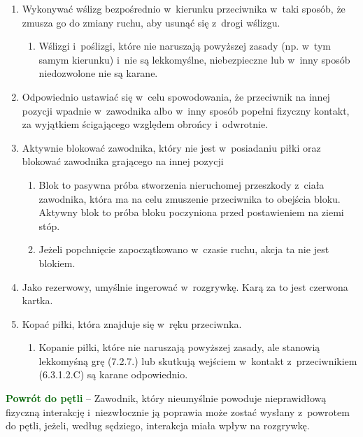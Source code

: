 \documentclass[12pt]{article}
\newcommand\other[1]{\bgroup\textcolor{darkgreen}{\textbf{#1}}}
\begin{document}
\begin{enumerate}
	\item
	      Wykonywać wślizg bezpośrednio w~kierunku przeciwnika w~taki sposób, że
	      zmusza go do zmiany ruchu, aby usunąć się z~drogi wślizgu.

	      \begin{enumerate}
		      \item
		            Wślizgi i~poślizgi, które nie naruszają powyższej zasady (np. w~tym
		            samym kierunku) i~nie są lekkomyślne, niebezpieczne lub w~inny
		            sposób niedozwolone nie są karane.
	      \end{enumerate}
	\item
	      Odpowiednio ustawiać się w~celu spowodowania, że przeciwnik na innej
	      pozycji wpadnie w~zawodnika albo w~inny sposób popełni fizyczny
	      kontakt, za wyjątkiem ścigającego względem obrońcy i~odwrotnie.
	\item
	      Aktywnie blokować zawodnika, który nie jest w~posiadaniu piłki oraz
	      blokować zawodnika grającego na innej pozycji

	      \begin{enumerate}
		      \item
		            Blok to pasywna próba stworzenia nieruchomej przeszkody z~ciała
		            zawodnika, która ma na celu zmuszenie przeciwnika to obejścia bloku.
		            Aktywny blok to próba bloku poczyniona przed postawieniem na ziemi
		            stóp.
		      \item
		            Jeżeli popchnięcie zapoczątkowano w~czasie ruchu, akcja ta nie jest
		            blokiem.
	      \end{enumerate}
	\item
	      Jako rezerwowy, umyślnie ingerować w~rozgrywkę. Karą za to jest
	      czerwona kartka.
	\item
	      Kopać piłki, która znajduje się w~ręku przeciwnka.

	      \begin{enumerate}
		      \item
		            Kopanie piłki, które nie naruszają powyższej zasady, ale stanowią
		            lekkomyśną grę (7.2.7.) lub skutkują wejściem w~kontakt z~przeciwnikiem (6.3.1.2.C) są karane odpowiednio.
	      \end{enumerate}
\end{enumerate}

\other{Powrót do pętli} -- Zawodnik, który nieumyślnie powoduje
nieprawidłową fizyczną interakcję i~niezwłocznie ją poprawia może zostać
wysłany z~powrotem do pętli, jeżeli, według sędziego, interakcja miała
wpływ na rozgrywkę.
\end{document}
